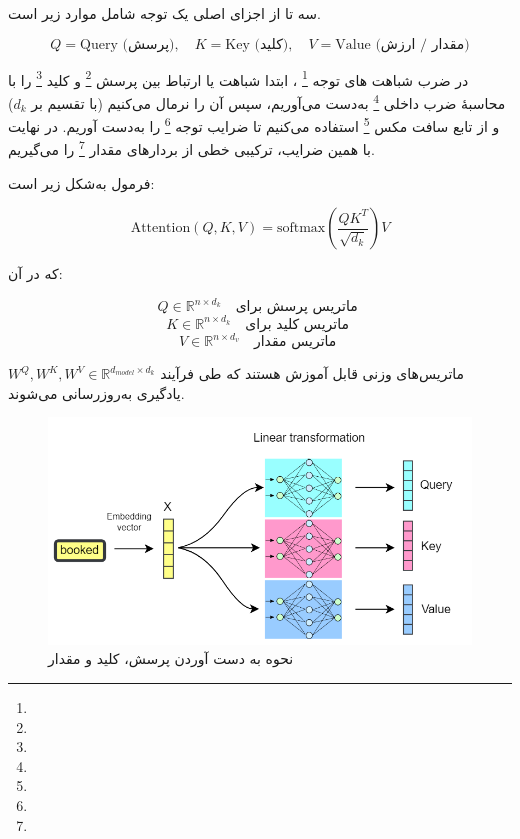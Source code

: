 سه تا از اجزای اصلی یک توجه شامل موارد زیر است.

\[
Q = \text{Query (پرسش)}, \quad K = \text{Key (کلید)}, \quad V = \text{Value (مقدار / ارزش)}
\]





در  ضرب شباهت های توجه \footnote{}    \cite{vaswani2017attention}، ابتدا شباهت یا ارتباط بین پرسش \footnote{} و کلید \footnote{} را با محاسبهٔ ضرب داخلی \footnote{} به‌دست می‌آوریم، سپس آن را نرمال می‌کنیم (با تقسیم بر \( d_k \)) و از تابع سافت مکس \footnote{} استفاده می‌کنیم تا ضرایب توجه \footnote{} را به‌دست آوریم. در نهایت با همین ضرایب، ترکیبی خطی از بردارهای مقدار \footnote{} را می‌گیریم.

فرمول به‌شکل زیر است:

\begin{equation}
	\text{Attention}(Q, K, V) = \text{softmax}\left( \frac{QK^T}{\sqrt{d_k}} \right) V
	\label{eq:attention}
\end{equation}

که در آن:

\[
Q \in \mathbb{R}^{n \times d_k} \quad \text{ماتریس پرسش برای }
\]
\[
K \in \mathbb{R}^{n \times d_k} \quad \text{ماتریس کلید برای }
\]
\[
V \in \mathbb{R}^{n \times d_v} \quad \text{ماتریس مقدار  }
\]



	 \( W^Q, W^K, W^V \in \mathbb{R}^{d_{model} \times d_k} \) ماتریس‌های وزنی قابل آموزش هستند که طی فرآیند یادگیری به‌روزرسانی می‌شوند.
	 
\begin{figure}[h]
	\centering
	\begin{minipage}[b]{0.7\textwidth}
		\centering
		\includegraphics[width=\textwidth]{transformer_images/qkv.png}
		\caption{نحوه به دست آوردن پرسش، کلید و مقدار}
		\label{fig:qkv}
	\end{minipage}
	\hfill
\end{figure}


